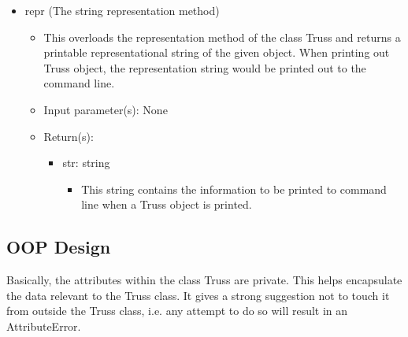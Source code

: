 \documentclass{article}
\begin{document}
\begin{itemize}
\item repr (The string representation method)
\begin{itemize}
\item This overloads the representation method of the class Truss and returns a printable representational string of the given object. When printing out Truss object, the representation string would be printed out to the command line. 
\item Input parameter(s): None
\item Return(s):
\begin{itemize}
\item str: string
\begin{itemize}
\item This string contains the information to be printed to command line when a Truss object is printed.
\end{itemize}
\end{itemize}
\end{itemize}
\end{itemize}
\subsection{OOP Design}
Basically, the attributes within the class Truss are private. This helps encapsulate the data relevant to the Truss class. It gives a strong suggestion not to touch it from outside the Truss class, i.e. any attempt to do so will result in an AttributeError. 
\end{document}
